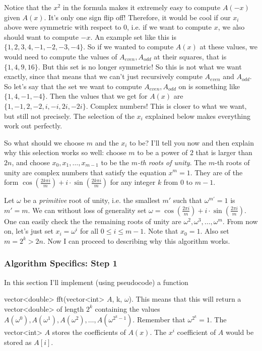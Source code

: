 Notice that the $x^2$ in the formula makes it extremely easy to compute $A(-x)$ given $A(x).$ It's only one sign flip off! Therefore, it would be cool if our $x_i$ above were symmetric with respect to 0, i.e. if we want to compute $x$, we also should want to compute $-x$. An example set like this is $\{1, 2, 3, 4, -1, -2, -3, -4 \}.$ So if we wanted to compute $A(x)$ at these values, we would need to compute the values of $A_{even}, A_{odd}$ at their squares, that is $\{1, 4, 9, 16 \}.$ But this set is no longer symmetric! So this is not what we want exactly, since that means that we can't just recursively compute $A_{even}$ and $A_{odd}.$ So let's say that the set we want to compute $A_{even}, A_{odd}$ on is something like $\{1, 4, -1, -4 \}.$ Then the values that we get for $A(x)$ are $\{1, -1, 2, -2, i, -i, 2i, -2i \}.$ Complex numbers! This is closer to what we want, but still not precisely. The selection of the $x_i$ explained below makes everything work out perfectly.

So what should we choose $m$ and the $x_i$ to be? I'll tell you now and then explain why this selection works so well: choose $m$ to be a power of $2$ that is larger than $2n$, and choose $x_0, x_1, \dots, x_{m-1}$ to be the $m$\emph{-th roots of unity}. The $m$-th roots of unity are complex numbers that satisfy the equation $x^m = 1.$ They are of the form $\cos\left(\frac{2k\pi i}{m}\right) + i \cdot \sin\left(\frac{2k\pi i}{m} \right)$ for any integer $k$ from $0$ to $m-1.$

Let $\omega$ be a \emph{primitive} root of unity, i.e. the smallest $m'$ such that $\omega^{m'} = 1$ is $m' = m.$ We can without loss of generality set $\omega = \cos\left(\frac{2\pi i}{m}\right) + i \cdot \sin\left(\frac{2\pi i}{m} \right).$ One can easily check the the remaining roots of unity are $\omega^2, \omega^3, \dots, \omega^m.$ From now on, let's just set $x_i = \omega^i$ for all $0 \le i \le m-1.$ Note that $x_0 = 1.$ Also set $m = 2^k > 2n.$ Now I can proceed to describing why this algorithm works.

\subsubsection{Algorithm Specifics: Step 1}

In this section I'll implement (using pseudocode) a function 

vector<double> fft(vector<int> $A$, k, $\omega$). This means that this will return a vector<double> of length $2^k$ containing the values $A(\omega^0), A(\omega^1), A(\omega^2), \dots, A(\omega^{2^k-1}).$ Remember that $\omega^{2^k} = 1.$ The vector<int> $A$ stores the coefficients of $A(x)$. The $x^i$ coefficient of $A$ would be stored as $A[i].$

